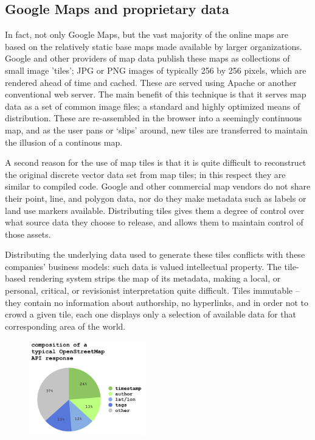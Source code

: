 \documentclass[11pt]{report}
\begin{document}
\subsection{Google Maps and proprietary data}

In fact, not only Google Maps, but the vast majority of the online maps are based on the relatively static base maps made available by larger organizations. Google and other providers of map data publish these maps as collections of small image 'tiles'; JPG or PNG images of typically 256 by 256 pixels, which are rendered ahead of time and cached. These are served using Apache or another conventional web server. The main benefit of this technique is that it serves map data as a set of common image files; a standard and highly optimized means of distribution. These are re-assembled in the browser into a seemingly continuous map, and as the user pans or `slips' around, new tiles are transferred to maintain the illusion of a continous map.

A second reason for the use of map tiles is that it is quite difficult to reconstruct the original discrete vector data set from map tiles; in this respect they are similar to compiled code. Google and other commercial map vendors do not share their point, line, and polygon data, nor do they make metadata such as labels or land use markers available. Distributing tiles gives them a degree of control over what source data they choose to release, and allows them to maintain control of those assets.

Distributing the underlying data used to generate these tiles conflicts with these companies' business models: such data is valued intellectual property. The tile-based rendering system strips the map of its metadata, making a local, or personal, critical, or revisionist interpretation quite difficult. Tiles immutable – they contain no information about authorship, no hyperlinks, and in order not to crowd a given tile, each one displays only a selection of available data for that corresponding area of the world. 

\begin{figure}
	\begin{flushleft}
		\includegraphics[width=0.45\textwidth]{images/osm-composition.png}
	\end{flushleft}
\end{figure}
\end{document}
